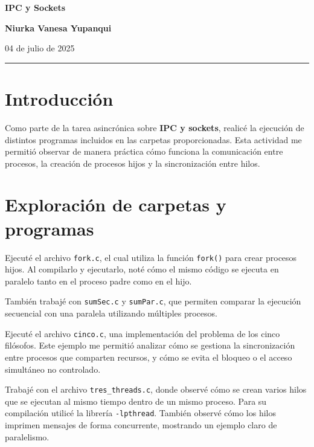 \documentclass[11pt]{article}
\renewcommand{\maketitle}{
    \begin{center}
        \vspace*{1cm}
        {\Huge \bfseries\color{blue!70!black} IPC y Sockets \par}
        \vspace{0.5cm}
        {\large \textbf{Niurka Vanesa Yupanqui} \par}
        \vspace{0.3cm}
        {\small 04 de julio de 2025 \par}
        \vspace{0.5cm}
        \hrule height 1pt
        \vspace{1cm}
    \end{center}
}
\begin{document}
\onehalfspacing
\pagestyle{empty}
\maketitle

\section*{Introducción}
\noindent
Como parte de la tarea asincrónica sobre \textbf{IPC y sockets}, realicé la ejecución de distintos programas incluidos en las carpetas proporcionadas. Esta actividad me permitió observar de manera práctica cómo funciona la comunicación entre procesos, la creación de procesos hijos y la sincronización entre hilos.

\section*{Exploración de carpetas y programas}

\begin{tcolorbox}[colback=blue!5!white, colframe=blue!40!black, title=Carpeta \texttt{procesos}]
Ejecuté el archivo \texttt{fork.c}, el cual utiliza la función \texttt{fork()} para crear procesos hijos. Al compilarlo y ejecutarlo, noté cómo el mismo código se ejecuta en paralelo tanto en el proceso padre como en el hijo. 

También trabajé con \texttt{sumSec.c} y \texttt{sumPar.c}, que permiten comparar la ejecución secuencial con una paralela utilizando múltiples procesos.
\end{tcolorbox}

\begin{tcolorbox}[colback=blue!5!white, colframe=blue!40!black, title=Carpeta \texttt{cinco/}]
Ejecuté el archivo \texttt{cinco.c}, una implementación del problema de los cinco filósofos. Este ejemplo me permitió analizar cómo se gestiona la sincronización entre procesos que comparten recursos, y cómo se evita el bloqueo o el acceso simultáneo no controlado.
\end{tcolorbox}

\begin{tcolorbox}[colback=blue!5!white, colframe=blue!40!black, title=Carpeta \texttt{threads/}]
Trabajé con el archivo \texttt{tres\_threads.c}, donde observé cómo se crean varios hilos que se ejecutan al mismo tiempo dentro de un mismo proceso. Para su compilación utilicé la librería \texttt{-lpthread}. También observé cómo los hilos imprimen mensajes de forma concurrente, mostrando un ejemplo claro de paralelismo.
\end{tcolorbox}
\end{document}
